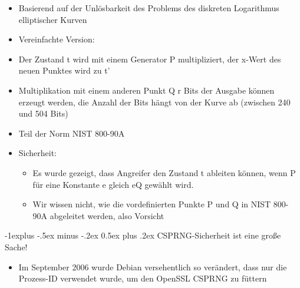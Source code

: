 \documentclass[a4paper]{article}
\makeatletter
\renewcommand{\subsection}{\@startsection{subsection}{2}{0mm}%
 {-1explus -.5ex minus -.2ex}%
 {0.5ex plus .2ex}%
 {\normalfont\normalsize\bfseries}}
\makeatother
\begin{document}
\begin{multicols}{3}
\begin{itemize}
              \begin{itemize}
                  \item
                        Basierend auf der Unlösbarkeit des Problems des diskreten
                        Logarithmus elliptischer Kurven
                  \item
                        Vereinfachte Version:
                  \item
                        Der Zustand t wird mit einem Generator P multipliziert, der x-Wert
                        des neuen Punktes wird zu t'
                  \item
                        Multiplikation mit einem anderen Punkt Q r Bits der Ausgabe können
                        erzeugt werden, die Anzahl der Bits hängt von der Kurve ab (zwischen
                        240 und 504 Bits)
                  \item
                        Teil der Norm NIST 800-90A
                  \item
                        Sicherheit:

                        \begin{itemize}
                            \item
                                  Es wurde gezeigt, dass Angreifer den Zustand t ableiten können,
                                  wenn P für eine Konstante e gleich eQ gewählt wird.
                            \item
                                  Wir wissen nicht, wie die vordefinierten Punkte P und Q in NIST
                                  800-90A abgeleitet werden, also Vorsicht
                        \end{itemize}
              \end{itemize}
    \end{itemize}


    \subsection{CSPRNG-Sicherheit ist eine große
        Sache!}

    \begin{itemize}
        \item
              Im September 2006 wurde Debian versehentlich so verändert, dass nur
              die Prozess-ID verwendet wurde, um den OpenSSL CSPRNG zu füttern


\end{itemize}
\end{multicols}
\end{document}
